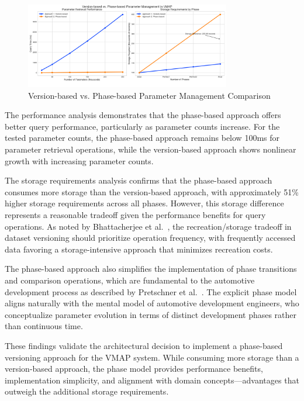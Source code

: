 \begin{figure}[h]
    \centering
    \includegraphics[width=0.8\textwidth]{figures/vmap_versioning_approaches_simplified.png}
    \caption{Version-based vs. Phase-based Parameter Management Comparison}
    \label{fig:versioning-approach-comparison}
\end{figure}

The performance analysis demonstrates that the phase-based approach offers better query performance, particularly as parameter counts increase. For the tested parameter counts, the phase-based approach remains below 100ms for parameter retrieval operations, while the version-based approach shows nonlinear growth with increasing parameter counts.

The storage requirements analysis confirms that the phase-based approach consumes more storage than the version-based approach, with approximately 51\% higher storage requirements across all phases. However, this storage difference represents a reasonable tradeoff given the performance benefits for query operations. As noted by Bhattacherjee et al.~\cite{bhattacherjee2015principles}, the recreation/storage tradeoff in dataset versioning should prioritize operation frequency, with frequently accessed data favoring a storage-intensive approach that minimizes recreation costs.

The phase-based approach also simplifies the implementation of phase transitions and comparison operations, which are fundamental to the automotive development process as described by Pretschner et al.~\cite{pretschner2007software}. The explicit phase model aligns naturally with the mental model of automotive development engineers, who conceptualize parameter evolution in terms of distinct development phases rather than continuous time.

These findings validate the architectural decision to implement a phase-based versioning approach for the \ac{VMAP} system. While consuming more storage than a version-based approach, the phase model provides performance benefits, implementation simplicity, and alignment with domain concepts—advantages that outweigh the additional storage requirements.

